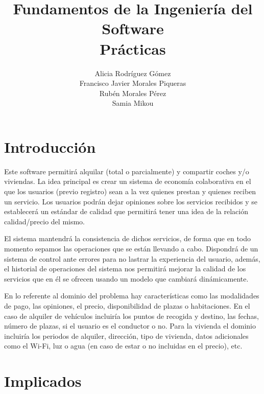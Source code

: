 \documentclass[11pt,spanish]{article} %
\title{Fundamentos de la Ingeniería del Software \\ Prácticas}
\author{Alicia Rodríguez Gómez \\ Francisco Javier Morales Piqueras\\ Rubén Morales Pérez\\ Samia Mikou}
\date{ }
\begin{document}
\maketitle
\tableofcontents %
\newpage
\setlength\parindent{0pt} %


\section{Introducción}
\hspace{0.5cm}Este software permitirá alquilar (total o parcialmente) y compartir coches y/o viviendas.
La idea principal es crear un sistema de economía colaborativa en el que los usuarios (previo registro) sean a la vez quienes prestan y quienes reciben un servicio.
Los usuarios podrán dejar opiniones sobre los servicios recibidos y se establecerá un estándar de calidad que permitirá tener una idea de la relación calidad/precio del mismo.

\hspace{0.5cm}El sistema mantendrá la consistencia de dichos servicios, de forma que en todo momento sepamos las operaciones que se están llevando a cabo.
Dispondrá de un sistema de control ante errores para no lastrar la experiencia del usuario, además, el historial de operaciones del sistema nos permitirá mejorar la calidad de los servicios que en él se ofrecen usando un modelo que cambiará dinámicamente.

\hspace{0.5cm}En lo referente al dominio del problema hay características como las modalidades de pago, las opiniones, el precio, disponibilidad de plazas o habitaciones.
En el caso de alquiler de vehículos incluiría los puntos de recogida y destino, las fechas, número de plazas, si el usuario es el conductor o no.
Para la vivienda el dominio incluiría los periodos de alquiler, dirección, tipo de vivienda, datos adicionales como el Wi-Fi, luz o agua (en caso de estar o no incluidas en el precio), etc.

\section{Implicados}
\end{document}
